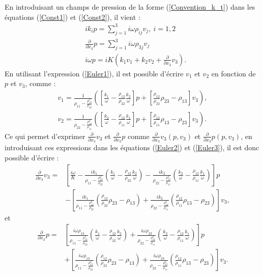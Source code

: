 \documentclass[twoside,openright]{report}
\begin{document}
    En introduisant un champs de pression de la forme (\ref{Convention_k_t}) dans les équations (\ref{Const1}) et (\ref{Const2}), il vient :
    \begin{align}
	&ik_ip=\sum_{\displaystyle{j=1}}^{\displaystyle{3}} i \omega \rho_{ij} v_j,\ i=1,2\label{Euler1}\\
	&\frac{\displaystyle{\partial}}{\displaystyle{\partial x_3}}p=\sum_{\displaystyle{j=1}}^{\displaystyle{3}} i \omega \rho_{3j} v_j\label{Euler2}\\
    &i\omega p= iK(k_1v_1+k_2v_2+\frac{\displaystyle{\partial}}{\displaystyle{\partial x_3}}v_3).\label{Euler3}
    \end{align}
	En utilisant l'expression (\ref{Euler1}), il est possible d'écrire $v_1$ et $v_2$ en fonction de $p$ et $v_3$, comme :
    \begin{align}
	v_1=\frac{1}{\displaystyle{\rho_{11}-\frac{\rho_{12}^2}{\rho_{22}}}}([\frac{k_1}{\omega}-\frac{\rho_{12}}{\rho_{22}}\frac{k_2}{\omega}]p+[\frac{\rho_{12}}{\rho_{22}}\rho_{23}-\rho_{13}]v_3), \\
	v_2=\frac{1}{\displaystyle{\rho_{22}-\frac{\rho_{12}^2}{\rho_{11}}}}([\frac{k_2}{\omega}-\frac{\rho_{12}}{\rho_{11}}\frac{k_1}{\omega}]p+[\frac{\rho_{12}}{\rho_{11}}\rho_{13}-\rho_{23}]v_3).
    \end{align}
 	Ce qui permet d'exprimer $\frac{\displaystyle{\partial}}{\displaystyle{\partial x_3}}v_3$ et $\frac{\displaystyle{\partial}}{\displaystyle{\partial x_3}}p$ comme $\frac{\displaystyle{\partial}}{\displaystyle{\partial x_3}}v_3(p,v_3)$ et $\frac{\displaystyle{\partial}}{\displaystyle{\partial x_3}}p(p,v_3)$, en introduisant ces expressions dans les équations (\ref{Euler2}) et (\ref{Euler3}), il est donc possible d'écrire :
    \begin{align*}
    \frac{\displaystyle{\partial}}{\displaystyle{\partial x_3}}v_3=&[\frac{i\omega}{K}-\frac{ik_1}{\rho_{11}-\frac{\rho_{12}^2}{\rho_{22}}}(\frac{k_1}{\omega}-\frac{\rho_{12}}{\rho_{22}}\frac{k_2}{\omega})-\frac{ik_2}{\rho_{22}-\frac{\rho_{12}^2}{\rho_{11}}}(\frac{k_2}{\omega}-\frac{\rho_{12}}{\rho_{11}}\frac{k_1}{\omega})]p\\
    &-[\frac{ik_1}{\rho_{11}-\frac{\rho_{12}^2}{\rho_{22}}}(\frac{\rho_{12}}{\rho_{22}}\rho_{23}-\rho_{13})+\frac{ik_2}{\rho_{22}-\frac{\rho_{12}^2}{\rho_{11}}}(\frac{\rho_{12}}{\rho_{11}}\rho_{13}-\rho_{23})]v_3,
    \end{align*}
    et 
    \begin{align*}
    \frac{\displaystyle{\partial}}{\displaystyle{\partial x_3}}p=&[\frac{i\omega \rho_{13}}{\rho_{11}-\frac{\rho_{12}^2}{\rho_{22}}}(\frac{k_1}{\omega}-\frac{\rho_{12}}{\rho_{22}}\frac{k_2}{\omega})+\frac{i\omega \rho_{23}}{\rho_{22}-\frac{\rho_{12}^2}{\rho_{11}}}(\frac{k_2}{\omega}-\frac{\rho_{12}}{\rho_{11}}\frac{k_1}{\omega})]p\\
    &+[\frac{i\omega \rho_{13}}{\rho_{11}-\frac{\rho_{12}^2}{\rho_{22}}}(\frac{\rho_{12}}{\rho_{22}}\rho_{23}-\rho_{13})+\frac{i\omega \rho_{23}}{\rho_{22}-\frac{\rho_{12}^2}{\rho_{11}}}(\frac{\rho_{12}}{\rho_{11}}\rho_{13}-\rho_{23})]v_3.
    \end{align*}
    
\end{document}

